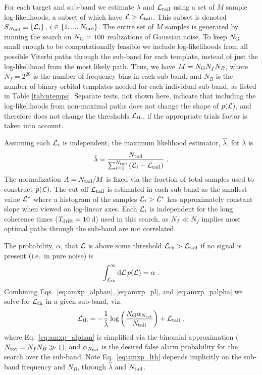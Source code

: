 \begin{subappendices}
For each target and sub-band we estimate $\lambda$ and $\mathcal{L}_{\rm tail}$ using a set of $M$ sample log-likelihoods, a subset of which have $\mathcal{L} > \mathcal{L}_{\rm tail}$. This subset is denoted $S_{N_{\rm tail}} \equiv \{\mathcal{L}_i \}$, $i \in \{1,...,N_{\rm tail} \}$. The entire set of $M$ samples is generated by running the search on $N_{\rm G} = 100$ realizations of Gaussian noise. To keep $N_{\rm G}$ small enough to be computationally feasible we include log-likelihoods from all possible Viterbi paths through the sub-band for each template, instead of just the log-likelihood from the most likely path. Thus, we have $M = N_{\rm G} N_f N_B$, where $N_f = 2^{20}$ is the number of frequency bins in each sub-band, and $N_B$ is the number of binary orbital templates needed for each individual sub-band, as listed in Table \ref{tab:ntemps}. Separate tests, not shown here, indicate that including the log-likelihoods from non-maximal paths does not change the shape of $p(\mathcal{L})$, and therefore does not change the thresholds $\mathcal{L}_{\rm th}$, if the appropriate trials factor is taken into account.

Assuming each $\mathcal{L}_i$ is independent, the maximum likelihood estimator, $\hat{\lambda}$, for $\lambda$ is
\begin{equation}
\hat{\lambda} = \frac{N_{\rm tail}}{\sum_{i=1}^{N_{\rm tail}} \left(\ml_i - \ml_{\rm tail} \right)}\ .
\end{equation}
The normalization $A = N_{\rm tail} / M$ is fixed via the fraction of total samples used to construct $p(\mathcal{L})$. The cut-off $\mathcal{L}_{\rm tail}$ is estimated in each sub-band as the smallest value $\mathcal{L}^*$ where a histogram of the samples $\mathcal{L}_i > \mathcal{L}^*$ has approximately constant slope when viewed on log-linear axes. Each $\mathcal{L}_i$ is independent for the long coherence times ($T_{\textrm{drift}}=10\,$d) used in this search, as $N_T \ll N_f$ implies most optimal paths through the sub-band are not correlated. 

The probability, $\alpha$, that $\mathcal{L}$ is above some threshold $\mathcal{L}_{\rm th} > \mathcal{L}_{\rm tail}$ if no signal is present (i.e.~in pure noise) is
\begin{equation}
\int_{\mathcal{L}_{\rm th}}^{\infty} {\rm d}\mathcal{L}\, p(\mathcal{L}) = \alpha\ . \label{eq:amxp_palpha}
\end{equation}
Combining Eqs.~\eqref{eq:amxp_alphan}, \eqref{eq:amxp_pl}, and \eqref{eq:amxp_palpha} we solve for $\mathcal{L}_{\rm th}$ in a given sub-band, viz.~
\begin{equation}
\mathcal{L}_{\rm th} = -\frac{1}{\hat{\lambda}} \log \left(\frac{N_{\rm G} \alpha_{N_{\rm tot}}}{N_{\rm tail}}\right) + \mathcal{L}_{\rm tail}\ , \label{eq:amxp_lth}
\end{equation}
where Eq.~\eqref{eq:amxp_alphan} is simplified via the binomial approximation ($N_{\rm tot} = N_f N_B \gg 1$), and $\alpha_{N_{\rm tot}}$ is the desired false alarm probability for the search over the sub-band. Note Eq.~\eqref{eq:amxp_lth} depends implicitly on the sub-band frequency and $N_B$, through $\hat{\lambda}$ and $N_{\rm tail}$. 


\end{subappendices}

